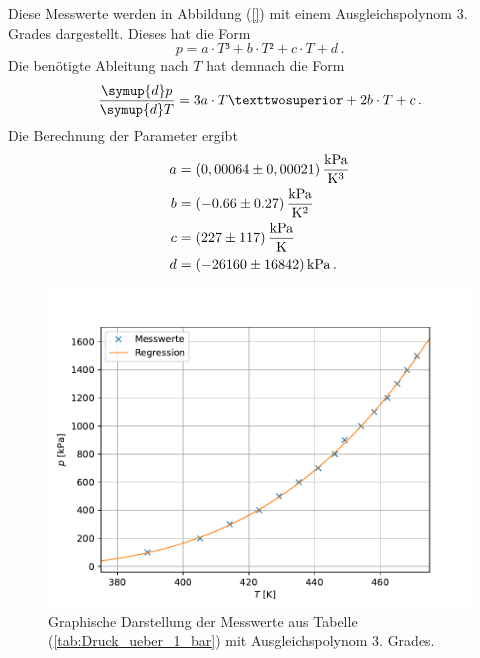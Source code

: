    Diese Messwerte werden in Abbildung (\ref{}) mit einem Ausgleichspolynom 3. Grades dargestellt.
    Dieses hat die Form 
    \begin{equation}
      p = a \cdot T³ + b \cdot T² + c \cdot T + d \,.
    \end{equation}
    Die benötigte Ableitung nach $T$ hat demnach die Form
    \begin{equation}
      \frac{\symup{d}p}{\symup{d}T} = 3  a \cdot T² + 2 b \cdot T + c \,.
    \end{equation}
    Die Berechnung der Parameter ergibt 
    \begin{align*}
      a &= (0,00064 \pm 0,00021) \, \unit[per-mode=fraction]{\kilo\pascal\per\kelvin\tothe{3}} \\
      b &= (-0.66 \pm 0.27)\, \unit[per-mode=fraction]{\kilo\pascal\per\kelvin\tothe{2}} \\
      c &= (227 \pm 117) \, \unit[per-mode=fraction]{\kilo\pascal\per\kelvin} \\
      d &= (-26160 \pm 16842) \, \unit{\kilo\pascal} \, .
    \end{align*}

    \begin{figure}[H]
      \centering
      \includegraphics{plot2.pdf}
      \caption{Graphische Darstellung der Messwerte aus Tabelle (\ref{tab:Druck_ueber_1_bar}) mit Ausgleichspolynom 3. Grades.}
      \label{fig:Druck_ueber_1_bar}
    \end{figure}
    
